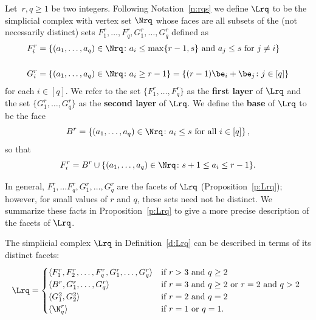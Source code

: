 \begin{defi}\label{d:Lrq}
Let~$r, q\ge 1$ be two integers. Following Notation~\ref{n:rqs} we define
$\Lrq$ to be the simplicial complex with vertex set $\Nrq$ whose faces
are all subsets of the (not necessarily distinct) sets $F^r_1, \dots,
F^r_{q}, G^r_1, \ldots , G^r_q$ defined as
\begin{align*}
F^r_i &=\{(a_1, \ldots, a_q) \in \Nrq \colon a_i \le \max\{r-1, s\} \mbox{ and }
a_j \leq s \mbox{ for } j \neq i\}\\ {}&\\ G^r_i&=\{(a_1, \ldots, a_q)
\in \Nrq \colon a_i \ge r-1\} = \{(r-1) \be_i + \be_j \colon j \in
    [q]\}
\end{align*}
for each $i\in [q]$.  We refer to the set $\{F^r_1, \dots, F^r_q\}$ as
the {\bf first layer} of $\Lrq$ and the set $\{G^r_1, \dots, G^r_q\}$
as the {\bf second layer} of $\Lrq$. We define the {\bf base} of
$\Lrq$ to be the face $$B^r=\left\{(a_1, \ldots, a_q) \in \Nrq \colon
a_i \le s \mbox{ for all } i\in [q] \right\},$$ so that
$$F_i^r=B^r \cup \{(a_1, \ldots, a_q) \in \Nrq \colon s+1 \le a_i \le r-1\}.$$
\end{defi}


In general, $F^r_1, \ldots F^r_q, G^r_1, \ldots , G^r_q$ are the
facets of $\Lrq$ (Proposition~\ref{p:Lrq}); however, for small values of $r$
and $q$, these sets need not be distinct. We summarize these facts
in Proposition~\ref{p:Lrq} to give a more precise description of the facets of
$\Lrq$.


\begin{prop} 
\label{p:Lrq}
The simplicial complex $\Lrq$ in Definition~\ref{d:Lrq} can be described in
terms of its distinct facets:
$$
\Lrq=\begin{cases}
\langle F^r_1, F^r_2, \dots, F^r_q, G^r_1,\dots, G^r_q\rangle &
\text{if $r>3$ and $q\ge 2$}\\
\langle B^r, G^r_1,\dots, G^r_q\rangle &
\text{if $r = 3$ and $q\geq 2$ or $r = 2$ and $q > 2$ }\\
\langle G^2_1, G^2_2\rangle &
\text{if $r = 2$ and $q=2$}\\
\langle \N^r_q \rangle &
\text{if $r=1$ or $q=1$.}\\
\end{cases}
$$  
\end{prop}

